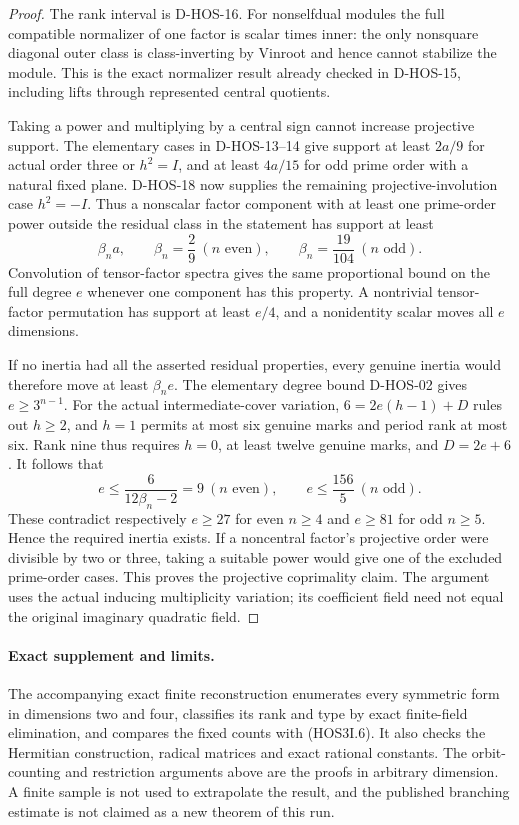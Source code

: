 \begin{proof}
The rank interval is D-HOS-16. For nonselfdual modules the full
compatible normalizer of one factor is scalar times inner:
the only nonsquare diagonal outer class is class-inverting by
Vinroot and hence cannot stabilize the module. This is the exact
normalizer result already checked in D-HOS-15, including lifts
through represented central quotients.

Taking a power and multiplying by a central sign cannot increase
projective support. The elementary cases in D-HOS-13--14 give
support at least $2a/9$ for actual order three or $h^2=I$, and
at least $4a/15$ for odd prime order with a natural fixed plane.
D-HOS-18 now supplies the remaining projective-involution case
$h^2=-I$. Thus a nonscalar factor component with at least one
prime-order power outside the residual class in the statement
has support at least
\[
 \beta_n a,\qquad
 \beta_n=\frac29\ (n\text{ even}),\qquad
 \beta_n=\frac{19}{104}\ (n\text{ odd}).                      \tag{HOS3I.14}
\]
Convolution of tensor-factor spectra gives the same proportional
bound on the full degree $e$ whenever one component has this
property. A nontrivial tensor-factor permutation has support
at least $e/4$, and a nonidentity scalar moves all $e$ dimensions.

If no inertia had all the asserted residual properties, every
genuine inertia would therefore move at least $\beta_n e$.
The elementary degree bound D-HOS-02 gives $e\ge3^{n-1}$.
For the actual intermediate-cover variation,
$6=2e(h-1)+D$ rules out $h\ge2$, and $h=1$ permits at most
six genuine marks and period rank at most six. Rank nine thus
requires $h=0$, at least twelve genuine marks, and $D=2e+6$.
It follows that
\[
 e\le\frac6{12\beta_n-2}
   =9\ (n\text{ even}),\qquad
 e\le\frac{156}{5}\ (n\text{ odd}).                          \tag{HOS3I.15}
\]
These contradict respectively $e\ge27$ for even $n\ge4$ and
$e\ge81$ for odd $n\ge5$. Hence the required inertia exists.
If a noncentral factor's projective order were divisible by two
or three, taking a suitable power would give one of the excluded
prime-order cases. This proves the projective coprimality claim.
The argument uses the actual inducing multiplicity variation;
its coefficient field need not equal the original imaginary
quadratic field.
\end{proof}

\paragraph{Exact supplement and limits.}
The accompanying exact finite reconstruction
enumerates every symmetric form in dimensions two and four,
classifies its rank and type by exact finite-field elimination,
and compares the fixed counts with (HOS3I.6). It also checks the
Hermitian construction, radical matrices and exact rational
constants. The orbit-counting and restriction arguments above
are the proofs in arbitrary dimension. A finite sample is not
used to extrapolate the result, and the published branching
estimate is not claimed as a new theorem of this run.
